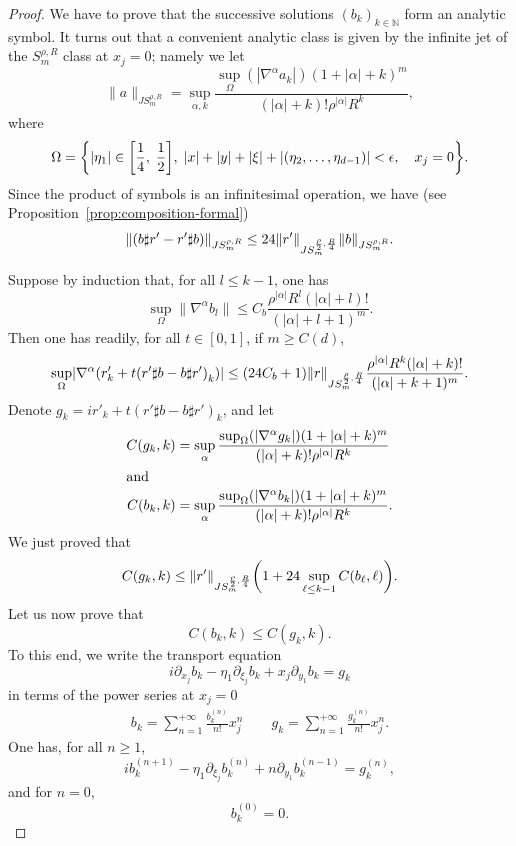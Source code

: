 \documentclass[AHL,Unicode,longabstracts,published]{cedram}
\newcommand\1{\mathds{1}}
\newcommand{\N}{\mathbb{N}}
\let\originalleft\left
\let\originalright\right
\renewcommand{\left}{\mathopen{}\mathclose\bgroup\originalleft}
\renewcommand{\right}{\aftergroup\egroup\originalright}
\begin{document}
\begin{proof}
We have to prove that the successive solutions $(b_k)_{k\in \N}$ form an analytic symbol. It turns out that a convenient analytic class is given by the infinite jet of the $S^{\rho,R}_m$ class at $x_j=0$; namely we let
\[
\|a\|_{JS^{\rho,R}_m}=\sup_{\alpha,k}\frac{\sup_\Omega(|\nabla^{\alpha}a_k|)(1+|\alpha|+k)^m}{(|\alpha|+k)!\rho^{|\alpha|}R^k},
\]
where
\[
\Omega=\left\{|\eta_{1}|\in \left[\frac 14,\; \frac 12\right],\;|x|+|y|+|\xi|+|(\eta_2,\dots,\eta_{d-1})|<\epsilon,\quad x_j=0
\right\}.
\]
Since the product of symbols is an infinitesimal operation, we have (see Proposition~\ref{prop:composition-formal})
\[
\left\|(b\sharp r'-r'\sharp b)\right\|_{JS^{\rho,R}_m}\leq 24\|r'\|_{JS^{\frac{\rho}2, \frac R4}_m}\|b\|_{JS^{\rho,R}_m}.
\]

Suppose by induction that, for all $l\leq k-1$, one has
\[
\sup_{\Omega}\|\nabla^{\alpha}b_l\|\leq C_b\frac{\rho^{|\alpha|}R^l(|\alpha|+l)!}{(|\alpha|+l+1)^m}.
\]
Then one has readily, for all $t\in [0,1]$, if $m\geq C(d)$,
\[
\sup_{\Omega}\left|\nabla^\alpha\left(r'_k+t\left(r'\sharp b - b \sharp r'\right)_k\right)\right|\leq (24C_b+1)\|r\|_{JS^{\frac{\rho}2,\frac R4}_m}\frac{\rho^{|\alpha|}R^k(|\alpha|+k)!}{(|\alpha|+k+1)^m}.
\]
Denote $g_k=ir'_k+t(r'\sharp b - b \sharp r')_k$, and let
\begin{align*}
C(g_k,k) &=\sup_{\alpha}\frac{\sup_\Omega(|\nabla^{\alpha}g_k|)(1+|\alpha|+k)^m}{(|\alpha|+k)!\rho^{|\alpha|}R^k}
\\
\intertext{and}
C(b_k,k) &=\sup_{\alpha}\frac{\sup_\Omega(|\nabla^{\alpha}b_k|)(1+|\alpha|+k)^m}{(|\alpha|+k)!\rho^{|\alpha|}R^k}.
\end{align*}
We just proved that
\[
C(g_k,k)\leq \|r'\|_{JS^{\frac{\rho}2, \frac R4}_m}\left(1+24\sup_{ \ell
\leq k-1}C(b_\ell,\ell)\right).
\]
Let us now prove that
\[
C(b_k,k)\leq C(g_k,k).
\]
To this end, we write the transport equation
\[
i\partial_{x_j}b_k-\eta_{1}\partial_{\xi_j}b_k+x_j
\partial_{y_{1}}b_k=g_k
\]
in terms of the power series at $x_j=0$
\begin{align*}
b_k=\sum_{n=1}^{+\infty} \frac{b_k^{(n)}}{n!}x_j^n  \qquad g_k=\sum_{n=1}^{+\infty}
\frac{g_k^{(n)}}{n!}x_j^n.
\end{align*}
One has, for all $n\geq 1$,
\begin{equation}\label{eq:transport}
ib_{k}^{(n+1)}-\eta_{1}\partial_{\xi_j}b_{k}^{(n)}+n\partial_{y_{1}}b_{k}^{(n-1)}=g_k^{(n)},
\end{equation}
and for $n=0$,
\[
b_{k}^{(0)}=0.
\]


\end{proof}
\end{document}
